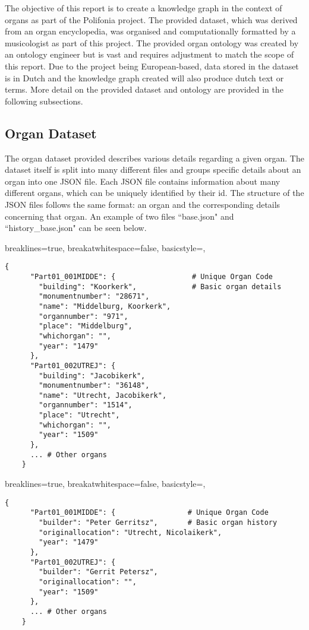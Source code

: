 The objective of this report is to create a knowledge graph in the context of organs as part of the Polifonia project. The provided dataset, which was derived from an organ encyclopedia, was organised and computationally formatted by a musicologist as part of this project. The provided organ ontology was created by an ontology engineer but is vast and requires adjustment to match the scope of this report. Due to the project being European-based, data stored in the dataset is in Dutch and the knowledge graph created will also produce dutch text or terms. More detail on the provided dataset and ontology are provided in the following subsections.  

\subsection{Organ Dataset}
\hspace{0.5cm} The organ dataset provided describes various details regarding a given organ. The dataset itself is split into many different files and groups specific details about an organ into one JSON file. Each JSON file contains information about many different organs, which can be uniquely identified by their id. The structure of the JSON files follows the same format: an organ and the corresponding details concerning that organ. An example of two files ``base.json" and ``history\_base.json" can be seen below. 

\lstset
{
    breaklines=true,
    breakatwhitespace=false,
    basicstyle=\linespread{1.25}\ttfamily,
}
\begin{lstlisting}[caption=base.json extract]
    {
      "Part01_001MIDDE": {                  # Unique Organ Code
        "building": "Koorkerk",             # Basic organ details
        "monumentnumber": "28671",
        "name": "Middelburg, Koorkerk",
        "organnumber": "971",
        "place": "Middelburg",
        "whichorgan": "",
        "year": "1479"
      },
      "Part01_002UTREJ": {
        "building": "Jacobikerk",
        "monumentnumber": "36148",
        "name": "Utrecht, Jacobikerk",
        "organnumber": "1514",
        "place": "Utrecht",
        "whichorgan": "",
        "year": "1509"
      },
      ... # Other organs
    }
\end{lstlisting}

\lstset
{
    breaklines=true,
    breakatwhitespace=false,
    basicstyle=\linespread{1.25}\ttfamily,
}
\begin{lstlisting}[caption=history\_base.json extract]
    {
      "Part01_001MIDDE": {                 # Unique Organ Code
        "builder": "Peter Gerritsz",       # Basic organ history
        "originallocation": "Utrecht, Nicolaikerk",
        "year": "1479"
      },
      "Part01_002UTREJ": {
        "builder": "Gerrit Petersz",
        "originallocation": "",
        "year": "1509"
      },
      ... # Other organs
    }
\end{lstlisting}

